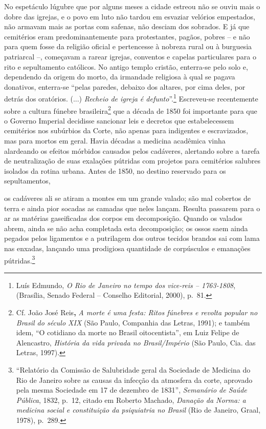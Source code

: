 No espetáculo lúgubre que por alguns meses a cidade estreou não se ouviu
mais o dobre das igrejas, e o povo em luto não tardou em esvaziar
velórios empestados, não armavam mais as portas com safenas, não desciam
dos sobrados. E já que cemitérios eram predominantemente para
protestantes, pagãos, pobres -- e não para quem fosse da religião
oficial e pertencesse à nobreza rural ou à burguesia patriarcal --,
começavam a rarear igrejas, conventos e capelas particulares para o rito
e sepultamento católicos. No antigo templo cristão, enterra-se pelo solo
e, dependendo da origem do morto, da irmandade religiosa à qual se
pagava donativos, enterra-se ``pelas paredes, debaixo dos altares, por
cima deles, por detrás dos oratórios. (...) \emph{Recheio de igreja é
defunto}''.\footnote{Luís Edmundo, \emph{O Rio de Janeiro no tempo dos
  vice-reis -- 1763-1808}, (Brasília, Senado Federal -- Conselho
  Editorial, 2000), p.~81.} Escreveu-se recentemente sobre a cultura
fúnebre brasileira\footnote{Cf. João José Reis\textbf{,} \emph{A morte é
  uma festa: Ritos fúnebres e revolta popular no Brasil do século XIX}
  (São Paulo, Companhia das Letras, 1991); e também idem, ``O cotidiano
  da morte no Brasil oitocentista'', em Luiz Felipe de Alencastro,
  \emph{História da vida privada no Brasil/Império} (São Paulo, Cia. das
  Letras, 1997).} que a década de 1850 foi importante para que o Governo
Imperial decidisse sancionar leis e decretos que estabelecessem
cemitérios nos subúrbios da Corte, não apenas para indigentes e
escravizados, mas para mortos em geral. Havia décadas a medicina
acadêmica vinha alardeando os efeitos mórbidos causados pelos cadáveres,
alertando sobre a tarefa de neutralização de suas exalações pútridas com
projetos para cemitérios salubres isolados da rotina urbana. Antes de
1850, no destino reservado para os sepultamentos,

os cadáveres ali se atiram a montes em um grande valado; são mal
cobertos de terra e ainda pior socadas as camadas que neles lançam.
Resulta passarem para o ar as matérias gaseificadas dos corpos em
decomposição. Quando os valados abrem, ainda se não acha completada esta
decomposição; os ossos saem ainda pegados pelos ligamentos e a
putrilagem dos outros tecidos brandos sai com lama nas enxadas, lançando
uma prodigiosa quantidade de corpúsculos e emanações pútridas.\footnote{``Relatório
  da Comissão de Salubridade geral da Sociedade de Medicina do Rio de
  Janeiro sobre as causas da infecção da atmosfera da corte, aprovado
  pela mesma Sociedade em 17 de dezembro de 1831'', \emph{Semanário de
  Saúde Pública}, 1832, p.~12, citado em Roberto Machado, \emph{Danação
  da Norma: a medicina social e constituição da psiquiatria no Brasil}
  (Rio de Janeiro, Graal, 1978), p.~289.}

